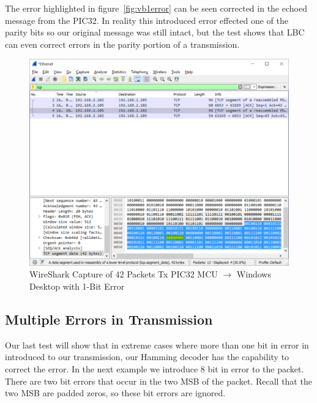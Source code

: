 \documentclass[12pt]{article}
\begin{document}
The error highlighted in figure~\ref{fig:vb1error} can be seen corrected
in the echoed message from the PIC32. In reality this introduced error
effected one of the parity bits so our original message was still intact, but
the test shows that LBC can even correct errors in the parity portion of
a transmission. 

\begin{figure}[H]
    \centering
    \includegraphics[width=5.5in]{images/wireshark_pictx_1bit_packets.PNG}
    \caption{WireShark Capture of 42 Packets Tx 
        PIC32 MCU $\rightarrow$ Windows Desktop with 1-Bit Error}
    \label{fig:pic1error}
\end{figure}

\subsection{Multiple Errors in Transmission}
\label{sec:multierrors}

Our last test will show that in extreme cases where more than one bit 
in error in introduced to our transmission, our Hamming decoder has the
capability to correct the error. In the next example we introduce 8 bit in
error to the packet. There are two bit errors that occur in the two MSB of
the packet. Recall that the two MSB are padded zeros, so these bit errors
are ignored.
\end{document}
